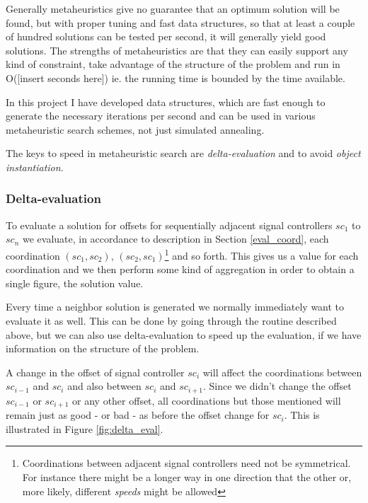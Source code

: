 Generally metaheuristics give no guarantee that an optimum solution will be found, but with proper tuning and fast data structures, so that at least a couple of hundred solutions can be tested per second, it will generally yield good solutions. The strengths of metaheuristics are that they can easily support any kind of constraint, take advantage of the structure of the problem and run in O([insert seconds here]) ie. the running time is bounded by the time available.

In this project I have developed data structures, which are fast enough to generate the necessary iterations per second and can be used in various metaheuristic search schemes, not just simulated annealing.

The keys to speed in metaheuristic search are \textit{delta-evaluation} and to avoid \textit{object instantiation}.

\subsubsection{Delta-evaluation}
To evaluate a solution for offsets for sequentially adjacent signal controllers $sc_1$ to $sc_n$ we evaluate, in accordance to description in Section \ref{eval_coord}, each coordination $(sc_1,sc_2)$, $(sc_2,sc_1)$\footnote{Coordinations between adjacent signal controllers need not be symmetrical. For instance there might be a longer way in one direction that the other or, more likely, different \textit{speeds} might be allowed} and so forth. This gives us a value for each coordination and we then perform some kind of aggregation in order to obtain a single figure, the solution value.

Every time a neighbor solution is generated we normally immediately want to evaluate it as well. This can be done by going through the routine described above, but we can also use delta-evaluation to speed up the evaluation, if we have information on the structure of the problem.

A change in the offset of signal controller $sc_i$ will affect the coordinations between $sc_{i-1}$ and $sc_{i}$ and also between $sc_{i}$ and $sc_{i+1}$. Since we didn't change the offset $sc_{i-1}$ or $sc_{i+1}$ or any other offset, all coordinations but those mentioned will remain just as good - or bad - as before the offset change for $sc_i$. This is illustrated in Figure \ref{fig:delta_eval}.

